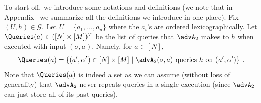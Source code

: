 %



To start off, we introduce some notations and definitions (we note that in Appendix~ we summarize all the definitions we introduce in one place).
Fix $(U,h)\in \mathcal{G}$. Let $U=\{a_1,\ldots,a_u\}$ where the $a_i$'s are ordered  lexicographically. 
Let $\Queries(a)\in ([N]\times [M])^T$ be the list of queries that $\advA_2$ makes to $h$ when executed with input $({\sigma},a)$. Namely, for $a\in [N]$,
\begin{align*}
\Queries(a) = \left\{ (a',\alpha') \in [N]\times [M] \mid \advA_2(\sigma,a) \text{  queries $h$ on   $(a',\alpha')$}\right\}\;.
\end{align*}
Note that $\Queries(a)$ is indeed a set as we can assume (without loss of generality) that $\advA_2$ never repeats queries in a single execution (since $\advA_2$ can just store all of its past queries).

